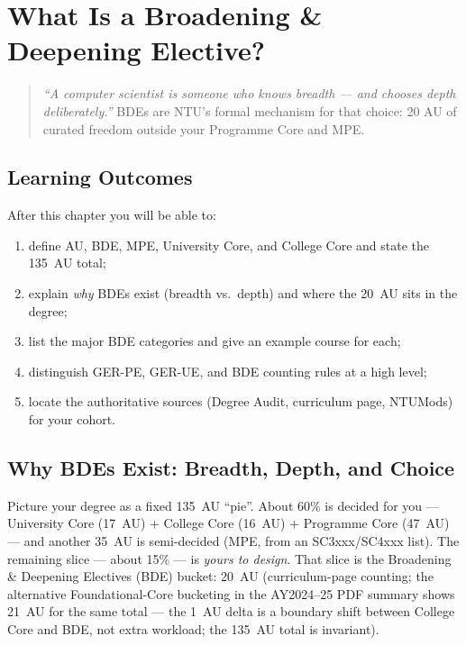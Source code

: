 \chapter{What Is a Broadening \& Deepening Elective?}
\label{ch:bde-overview}

\begin{quote}
\emph{``A computer scientist is someone who knows breadth --- and chooses depth deliberately.''}
BDEs are NTU's formal mechanism for that choice: 20 AU of curated freedom outside your Programme Core and MPE.
\end{quote}

\noindent{}
\vspace{0.4em}

\section*{Learning Outcomes}
After this chapter you will be able to:
\begin{enumerate}[label=(L\arabic*)]
    \item define AU, BDE, MPE, University Core, and College Core and state the 135~AU total;
    \item explain \emph{why} BDEs exist (breadth vs.\ depth) and where the 20~AU sits in the degree;
    \item list the major BDE categories and give an example course for each;
    \item distinguish GER-PE, GER-UE, and BDE counting rules at a high level;
    \item locate the authoritative sources (Degree Audit, curriculum page, NTUMods) for your cohort.
\end{enumerate}

\section{Why BDEs Exist: Breadth, Depth, and Choice}
\label{sec:why-bde}

Picture your degree as a fixed 135~AU ``pie''. About 60\% is decided for you --- University Core (17~AU) + College Core (16~AU) + Programme Core (47~AU) --- and another 35~AU is semi-decided (MPE, from an SC3xxx/SC4xxx list). The remaining slice --- about 15\% --- is \emph{yours to design}. That slice is the Broadening \& Deepening Electives (BDE) bucket: 20~AU (curriculum-page counting; the alternative Foundational-Core bucketing in the AY2024--25 PDF summary shows 21~AU for the same total --- the 1~AU delta is a boundary shift between College Core and BDE, not extra workload; the 135~AU total is invariant).

